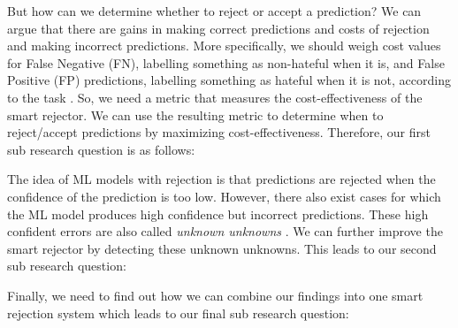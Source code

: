But how can we determine whether to reject or accept a prediction? We can argue that there are gains in making correct predictions and costs of rejection and making incorrect predictions. More specifically, we should weigh cost values for False Negative (FN), labelling something as non-hateful when it is, and False Positive (FP) predictions, labelling something as hateful when it is not, according to the task \cite{sayin2021science}. So, we need a metric that measures the cost-effectiveness of the smart rejector. We can use the resulting metric to determine when to reject/accept predictions by maximizing cost-effectiveness. Therefore, our first sub research question is as follows:


The idea of ML models with rejection is that predictions are rejected when the confidence of the prediction is too low. However, there also exist cases for which the ML model produces high confidence but incorrect predictions. These high confident errors are also called \textit{unknown unknowns} \cite{liu2020towards}. We can further improve the smart rejector by detecting these unknown unknowns. This leads to our second sub research question:


Finally, we need to find out how we can combine our findings into one smart rejection system which leads to our final sub research question:



